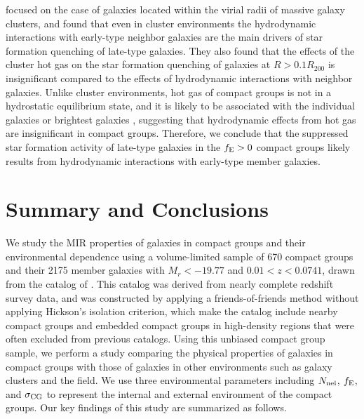 \documentclass[12pt,preprint,apj]{emulateapj}
\newcommand{\efrac}{f_{\rm E}}
\newcommand{\nbg}{N_{\rm nei}}
\begin{document}
\citet{park+09} focused on the case of galaxies located within the virial 
radii of massive galaxy clusters, and found that even in cluster environments
the hydrodynamic interactions with early-type neighbor galaxies are the main drivers
of star formation quenching of late-type galaxies. 
They also found that the effects of the cluster hot gas on the star formation quenching 
of galaxies at $R>0.1R_{200}$ is insignificant compared to the effects of hydrodynamic interactions with neighbor galaxies. Unlike cluster environments, hot gas of compact groups is not in a hydrostatic 
equilibrium state, and it is likely to be associated with the individual galaxies or 
brightest galaxies \citep{desjardins+13, desjardins+14}, suggesting that 
hydrodynamic effects from hot gas are insignificant in compact groups.
Therefore, we conclude that the suppressed star formation activity of late-type galaxies 
in the $\efrac>0$ compact groups likely results from hydrodynamic interactions 
with early-type member galaxies.


\section{Summary and Conclusions}\label{conclusions}

We study the MIR properties of galaxies in compact groups and 
their environmental dependence using a volume-limited sample 
of 670 compact groups and their 2175 member galaxies with 
$M_r<-19.77$ and $0.01<z<0.0741$, drawn from the catalog 
of \citet{sohn+16}. This catalog was derived from nearly complete redshift 
survey data, and was constructed by applying a friends-of-friends method
without applying Hickson's isolation criterion, which make the catalog 
include nearby compact groups and embedded compact groups in high-density regions
that were often excluded from previous catalogs. 
Using this unbiased compact group sample, we perform a study 
comparing the physical properties of galaxies in compact groups with 
those of galaxies in other environments such as galaxy clusters and the field. 
We use three environmental parameters including $\nbg$, $\efrac$, and 
$\sigma_{\rm CG}$ to represent the internal and external environment 
of the compact groups. Our key findings of this study are summarized as follows.
\end{document}
